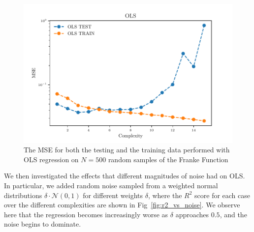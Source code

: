 \documentclass[reprint, english, nofootinbib]{revtex4-2}
\begin{document}
\begin{figure}[h!tb]
    \center
    \includegraphics[width=\columnwidth]{../figs/OLS_MSE_Bootstrap_Hastie_211_N_500.pdf}
    \caption{\label{fig:Hastie2.11 MSE Bootstrap}The MSE for both the testing and the training data performed with OLS regression on $N=500$ random samples of the Franke Function}
\end{figure}

We then investigated the effects that different magnitudes of noise had on OLS. In particular, we added random noise sampled from a weighted normal distributions $\delta \cdot \mathcal N(0, 1)$ for different weights $\delta$, where the $R^2$ score for each case over the different complexities are shown in Fig~\ref{fig:r2_vs_noise}.
We observe here that the regression becomes increasingly worse as $\delta$ approaches $0.5$, and the noise begins to dominate.
\end{document}
